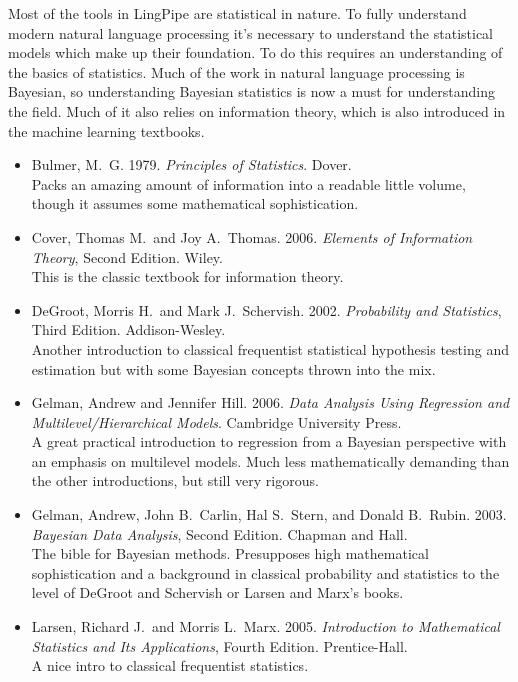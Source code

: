 \noindent
Most of the tools in LingPipe are statistical in nature.  To fully
understand modern natural language processing it's necessary to
understand the statistical models which make up their foundation.
To do this requires an understanding of the basics of statistics.
Much of the work in natural language processing is Bayesian, so
understanding Bayesian statistics is now a must for understanding
the field.  Much of it also relies on information theory, which is
also introduced in the machine learning textbooks.

\begin{itemize}
%
\item
Bulmer, M.~G.
1979.
{\it Principles of Statistics}.
Dover.
\\
{\footnotesize Packs an amazing amount of information into
a readable little volume, though it assumes some mathematical
sophistication.}
%
\item Cover, Thomas M.\ and Joy A.\ Thomas.
2006.
{\it Elements of Information Theory}, Second Edition.
Wiley.
\\
{\footnotesize This is the classic textbook for information theory.}
%
\item
DeGroot, Morris H.\ and Mark J.\ Schervish.
2002.
{\it Probability and Statistics},  Third Edition.
Addison-Wesley.
\\
{\footnotesize Another introduction to classical frequentist
statistical hypothesis testing and estimation but with some Bayesian
concepts thrown into the mix.}
%
\item
Gelman, Andrew and Jennifer Hill.
2006.
{\it Data Analysis Using Regression and Multilevel/Hierarchical Models}.
Cambridge University Press.
\\
{\footnotesize A great practical introduction to regression from a Bayesian
perspective with an emphasis on multilevel models.  Much less mathematically
demanding than the other introductions, but still very rigorous.}
%
\item
Gelman, Andrew, John B.~Carlin, Hal S.\ Stern, and Donald B.\ Rubin.
2003.
{\it Bayesian Data Analysis}, Second Edition.
Chapman and Hall.
\\
{\footnotesize The bible for Bayesian methods.  Presupposes high
mathematical sophistication and a background in classical probability
and statistics to the level of DeGroot and Schervish or Larsen
and Marx's books.}
%
\item
Larsen, Richard J.\ and Morris L.\ Marx.
2005.
{\it Introduction to Mathematical Statistics and Its Applications}, Fourth Edition.
Prentice-Hall.
\\
{\footnotesize A nice intro to classical frequentist statistics.}
%
\end{itemize}


